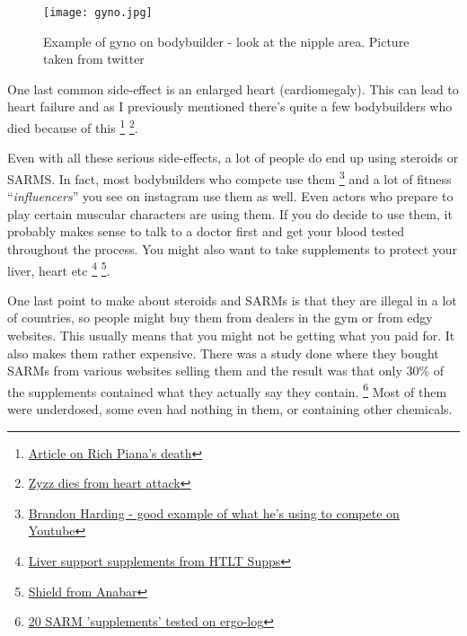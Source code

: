 \documentclass[openany, 12pt]{book}
\begin{document}
	\begin{figure}[h]
		\centering
		\texttt{[image: gyno.jpg]}
		\caption{Example of gyno on bodybuilder - look at the nipple area. Picture taken from twitter}
		\label{fig7}
	\end{figure}

        One last common side-effect is an enlarged heart (cardiomegaly). This can lead to heart failure and as I previously mentioned there's quite a few bodybuilders who died because of this
        \footnote{\href{https://www.menshealth.com/trending-news/a19541843/bodybuilder-rich-piana-autopsy-report/}{Article on Rich Piana's death}}
        \footnote{\href{https://www.dailytelegraph.com.au/news/nsw/bodybuilder-aziz-zyzz-shavershian-killed-by-heart-defect/news-story/57bbadf89f78c5d678d4df0c5b35d0d5}
        {Zyzz dies from heart attack}}.
        
        Even with all these serious side-effects, a lot of people do end up using steroids or SARMS. In fact, most bodybuilders who compete use them
        \footnote{\href{https://www.youtube.com/watch?v=k8mBn3Dp7h4}{Brandon Harding - good example of what he's using to compete on Youtube}}
        and a lot of fitness ``\textit{influencers}''
        you see on instagram use them as well. Even actors who prepare to play certain muscular characters are using them. If you do decide to use them, it probably makes sense to talk to a
        doctor first and get your blood tested throughout the process. You might also want to take supplements to protect your liver, heart etc
        \footnote{\href{https://www.htltsupps.com/collections/capsules/products/liver-support/}{Liver support supplements from HTLT Supps}}
        \footnote{\href{https://theanabar.com/products/shield?variant=33058384969837/}{Shield from Anabar}}.

        One last point to make about steroids and SARMs is that they are illegal in a lot of countries, so people might buy them from dealers in the gym or from edgy websites. This usually means
        that you might not be getting what you paid for. It also makes them rather expensive. There was a study done where they bought SARMs from various websites selling them and the result was that
        only 30\% of the supplements contained what they actually say they contain.
        \footnote{\href{https://ergo-log.com/20-sarm-supplements-tested.html}{20 SARM 'supplements' tested on ergo-log}}
        Most of them were underdosed, some even had nothing in them, or containing other chemicals.
\end{document}
